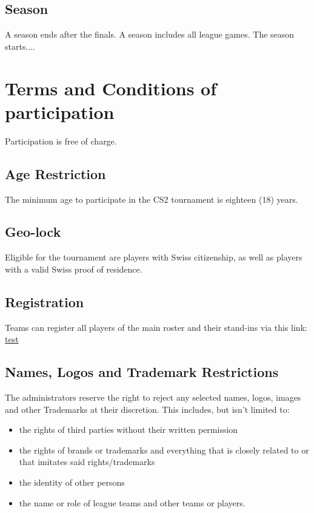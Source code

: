 \documentclass{article}
\begin{document}
\subsection{Season}
A season ends after the finals. A season includes all league games. The season starts....





\section{Terms and Conditions of participation}

Participation is free of charge.


\subsection{Age Restriction}

The minimum age to participate in the CS2 tournament is eighteen (18) years.

\subsection{Geo-lock}
Eligible for the tournament are players with Swiss citizenship, as well as players with a valid Swiss proof of residence.

\subsection{Registration}
Teams can register all players of the main roster and their stand-ins via this link: \href{www.google.com}{test} %

\subsection{Names, Logos and Trademark Restrictions}
The administrators reserve the right to reject any selected names, logos, images and other Trademarks at their discretion. This
includes, but isn't limited to:
\begin{itemize}
    \item the rights of third parties without their written permission
    \item the rights of brands or trademarks and everything that is closely related to or that imitates said rights/trademarks
    \item the identity of other persons
    \item the name or role of league teams and other teams or players.
\end{itemize}
\end{document}
